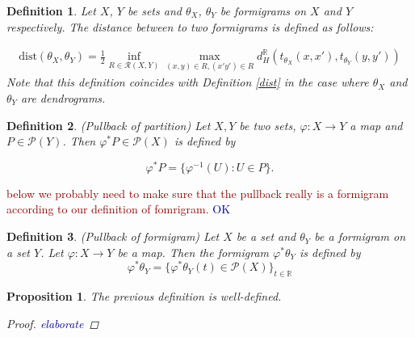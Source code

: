 \documentclass[a4paper,12pt]{article}
\newtheorem{proposition}{Proposition}[section]
\newtheorem{definition}{Definition}[section]
\newcommand{\woojin}[1]           {{ \textcolor{darkblue} {#1}}}
\newcommand{\facundo}[1]                {{ \textcolor{darkred} {#1}}}
\begin{document}
\begin{definition} Let $X$, $Y$ be sets and $\theta_X$, $\theta_Y$ be formigrams on $X$ and $Y$ respectively. The distance between to two formigrams is defined as follows:\label{dist2}

\begin{align*}
\mathrm{dist}(\theta_X, \theta_Y)= \frac{1}{2}\inf_{R\in\mathcal{R}(X,Y)}\max_{(x,y)\in R, (x'y')\in R}d_{H}^{\mathbb{R}}(t_{\theta_X}(x,x'), t_{\theta_Y}(y,y'))
\end{align*}
Note that this definition coincides with Definition \ref{dist} in the case where $\theta_X$ and $\theta_Y$ are dendrograms.
\end{definition} 



\begin{definition}(Pullback of partition) Let $X,Y$ be two sets, $\varphi:X\rightarrow Y$ a map and $P\in \mathcal{P}(Y)$. Then 
$\varphi^*P\in \mathcal{P}(X)$ is defined by

$$\varphi^*P=\{\varphi^{-1}(U): U\in P\}.$$
\end{definition}

\facundo{below we probably need to make sure that the pullback really is a formigram according to our definition of fomrigram.}\woojin{OK}

\begin{definition}\label{pullback}(Pullback of formigram) Let $X$ be a set and $\theta_Y$ be a formigram on a set $Y$. Let $\varphi:X\rightarrow Y$ be a map. Then the formigram $\varphi^*\theta_Y$ is defined by
$$\varphi^*\theta_Y=\{\varphi^*\theta_Y(t)\in \mathcal{P}(X)\}_{t\in\mathbb{R}}$$
\end{definition}

\begin{proposition} The previous definition is well-defined.
\begin{proof}
\woojin{elaborate}
\end{proof}

\end{proposition}
\end{document}
